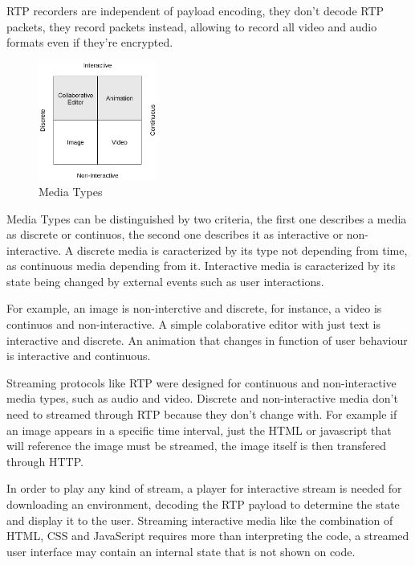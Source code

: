   \ac{RTP} recorders are independent of payload encoding, they don't decode \ac{RTP} packets, they record packets instead, allowing to record all video and audio formats even if they're encrypted.

\begin{figure}[H]
	\begin{center}
		\centering
		\includegraphics[width=0.35\textwidth]{figures/media_types.png}

	\caption{Media Types}
	\end{center}
\end{figure}

	Media Types can be distinguished by two criteria, the first one describes a media as discrete or continuos, the second one describes it as interactive or non-interactive. A discrete media is caracterized by its type not depending from time, as continuous media depending from it. Interactive media is caracterized by its state being changed by external events such as user interactions.

	For example, an image is non-interctive and discrete, for instance, a video is continuos and non-interactive. A simple colaborative editor with just text is interactive and discrete. An animation that changes in function of user behaviour is interactive and continuous.

	Streaming protocols like \ac {RTP} were designed for continuous and non-interactive media types, such as audio and video. Discrete and non-interactive media don't need to streamed through \ac{RTP} because they don't change with. For example if an image appears in a specific time interval, just the \ac{HTML} or javascript that will reference the image must be streamed, the image itself is then transfered through \ac{HTTP}.

	In order to play any kind of stream, a player for interactive stream is needed for downloading an environment, decoding the \ac{RTP} payload to determine the state and display it to the user. Streaming interactive media like the combination of \ac{HTML}, \ac{CSS} and JavaScript requires more than interpreting the code, a streamed user interface may contain an internal state that is not shown on code.

